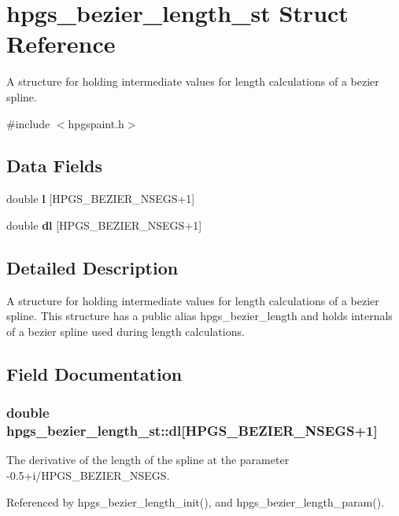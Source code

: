 \section{hpgs\_\-bezier\_\-length\_\-st Struct Reference}
\label{structhpgs__bezier__length__st}


A structure for holding intermediate values for length calculations of a bezier spline.  




{\ttfamily \#include $<$hpgspaint.h$>$}

\subsection*{Data Fields}
\begin{DoxyCompactItemize}
\item 
double {\bf l} [HPGS\_\-BEZIER\_\-NSEGS+1]
\item 
double {\bf dl} [HPGS\_\-BEZIER\_\-NSEGS+1]
\end{DoxyCompactItemize}


\subsection{Detailed Description}
A structure for holding intermediate values for length calculations of a bezier spline. This structure has a public alias {\ttfamily hpgs\_\-bezier\_\-length} and holds internals of a bezier spline used during length calculations. 

\subsection{Field Documentation}
\subsubsection[{dl}]{\setlength{\rightskip}{0pt plus 5cm}double {\bf hpgs\_\-bezier\_\-length\_\-st::dl}[HPGS\_\-BEZIER\_\-NSEGS+1]}\label{structhpgs__bezier__length__st_a796a0a19c199113346316abce43d4adc}
The derivative of the length of the spline at the parameter -\/0.5+i/HPGS\_\-BEZIER\_\-NSEGS. 

Referenced by hpgs\_\-bezier\_\-length\_\-init(), and hpgs\_\-bezier\_\-length\_\-param().

